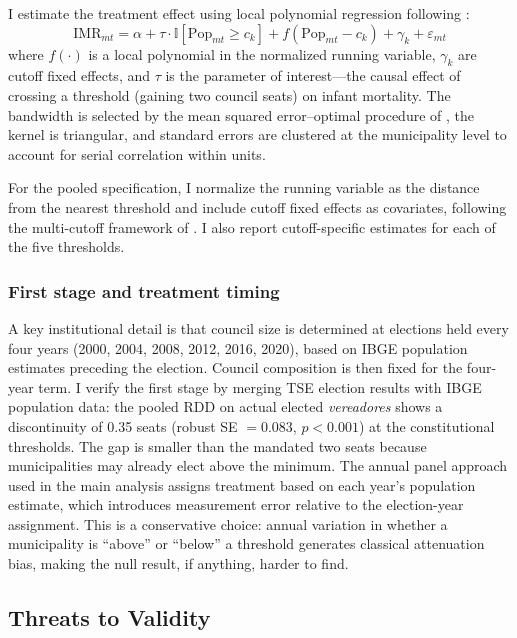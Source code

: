 \documentclass[12pt]{article}
\newcommand{\ind}{\mathbb{I}}
\begin{document}
I estimate the treatment effect using local polynomial regression following \citet{calonico2014robust}:
\begin{equation}
\text{IMR}_{mt} = \alpha + \tau \cdot \ind[\text{Pop}_{mt} \geq c_k] + f(\text{Pop}_{mt} - c_k) + \gamma_k + \varepsilon_{mt}
\end{equation}
where $f(\cdot)$ is a local polynomial in the normalized running variable, $\gamma_k$ are cutoff fixed effects, and $\tau$ is the parameter of interest---the causal effect of crossing a threshold (gaining two council seats) on infant mortality. The bandwidth is selected by the mean squared error--optimal procedure of \citet{calonico2014robust}, the kernel is triangular, and standard errors are clustered at the municipality level to account for serial correlation within units.

For the pooled specification, I normalize the running variable as the distance from the nearest threshold and include cutoff fixed effects as covariates, following the multi-cutoff framework of \citet{cattaneo2016interpreting}. I also report cutoff-specific estimates for each of the five thresholds.

\subsubsection*{First stage and treatment timing} A key institutional detail is that council size is determined at elections held every four years (2000, 2004, 2008, 2012, 2016, 2020), based on IBGE population estimates preceding the election. Council composition is then fixed for the four-year term. I verify the first stage by merging TSE election results with IBGE population data: the pooled RDD on actual elected \textit{vereadores} shows a discontinuity of 0.35 seats (robust SE $= 0.083$, $p < 0.001$) at the constitutional thresholds. The gap is smaller than the mandated two seats because municipalities may already elect above the minimum. The annual panel approach used in the main analysis assigns treatment based on each year's population estimate, which introduces measurement error relative to the election-year assignment. This is a conservative choice: annual variation in whether a municipality is ``above'' or ``below'' a threshold generates classical attenuation bias, making the null result, if anything, harder to find.

\subsection{Threats to Validity}
\end{document}
